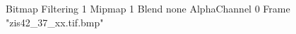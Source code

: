 {Bitmap
	{Filtering 1}
	{Mipmap 1}
	{Blend none}
	{AlphaChannel 0}
	{Frame "zis42_37_xx.tif.bmp"}
}
